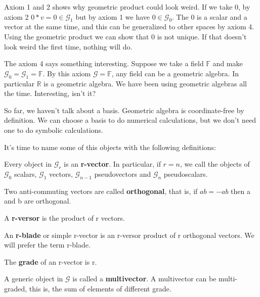 Axiom 1 and 2 shows why geometric product could look weird. If we take $0$, by axiom 2 $0*v=0 \in \mathcal{G}_1$ but by axiom 1 we have $0 \in \mathcal{G}_0$. The $0$ is a scalar and a vector at the same time, and this can be generalized to other spaces by axiom 4. Using the geometric product we can show that $0$ is not unique. If that doesn't look weird the first time, nothing will do.

The axiom 4 says something interesting. Suppose we take a field $\mathbb{F}$ and make $\mathcal{G}_0 = \mathcal{G}_1 = \mathbb{F}$. By this axiom $\mathcal{G} = \mathbb{F}$, any field can be a geometric algebra. In particular $\mathbb{R}$ is a geometric algebra. We have been using geometric algebras all the time. Interesting, isn't it?

\begin{remark}
So far, we haven't talk about a basis. Geometric algebra is coordinate-free by definition. We can choose a basis to do numerical calculations, but we don't need one to do symbolic calculations. 
\end{remark}

It's time to name some of this objects with the following definitions:

\begin{definition}
Every object in $\mathcal{G}_r$ is an \textbf{r-vector}. In particular, if $r=n$, we call the objects of $\mathcal{G}_0$ scalars, $\mathcal{G}_1$ vectors, $\mathcal{G}_{n-1}$ pseudovectors and $\mathcal{G}_n$ pseudoscalars.
\end{definition}

\begin{definition}
Two anti-commuting vectors are called \textbf{orthogonal}, that is, if $ab = -ab$ then a and b are orthogonal.
\end{definition}

\begin{definition}
A \textbf{r-versor} is the product of r vectors.
\end{definition}

\begin{definition}
An \textbf{r-blade} or simple r-vector is an r-versor product of r orthogonal vectors. We will prefer the term r-blade.
\end{definition}

\begin{definition}
The \textbf{grade} of an r-vector is r.
\end{definition}

\begin{definition}
A generic object in $\mathcal{G}$ is called a \textbf{multivector}. A multivector can be multi-graded, this is, the sum of elements of different grade.
\end{definition}

